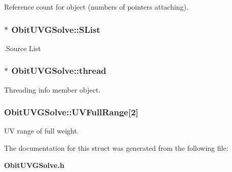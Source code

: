 Reference count for object (numbers of pointers attaching). 

\subsubsection{$\ast$ {\bf Obit\-UVGSolve::SList}}\label{structObitUVGSolve_o7}


.Source List 

\subsubsection{$\ast$ {\bf Obit\-UVGSolve::thread}}\label{structObitUVGSolve_o4}


Threading info member object. 

\subsubsection{ {\bf Obit\-UVGSolve::UVFull\-Range}[2]}\label{structObitUVGSolve_o9}


UV range of full weight. 



The documentation for this struct was generated from the following file:\begin{CompactItemize}
\item 
{\bf Obit\-UVGSolve.h}\end{CompactItemize}
